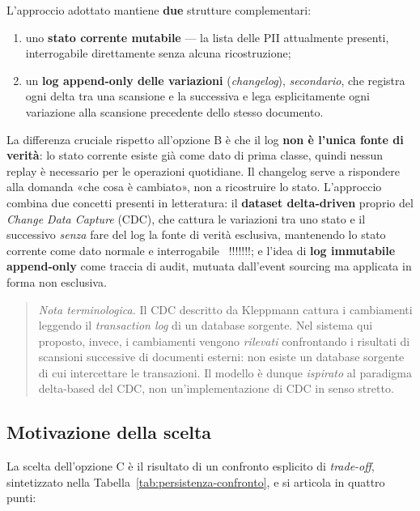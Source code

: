 L'approccio adottato mantiene \textbf{due} strutture complementari:
\begin{enumerate}
	\item uno \textbf{stato corrente mutabile} --- la lista delle PII attualmente presenti, interrogabile direttamente senza alcuna ricostruzione;
	\item un \textbf{log append-only delle variazioni} (\textit{changelog}), \textit{secondario}, che registra ogni delta tra una scansione e la successiva e lega esplicitamente ogni variazione alla scansione precedente dello stesso documento.
\end{enumerate}

La differenza cruciale rispetto all'opzione B è che il log \textbf{non è l'unica fonte di verità}: lo stato corrente esiste già come dato di prima classe, quindi nessun replay è necessario per le operazioni quotidiane. Il changelog serve a rispondere alla domanda «che cosa è cambiato», non a ricostruire lo stato. L'approccio combina due concetti presenti in letteratura: il \textbf{dataset delta-driven} proprio del \textit{Change Data Capture} (CDC), che cattura le variazioni tra uno stato e il successivo \textit{senza} fare del log la fonte di verità esclusiva, mantenendo lo stato corrente come dato normale e interrogabile~\cite{kleppmannDesigningDataIntensive2017} !!!!!!!; e l'idea di \textbf{log immutabile append-only} come traccia di audit, mutuata dall'event sourcing ma applicata in forma non esclusiva.

\begin{quote}
	\textit{Nota terminologica.} Il CDC descritto da Kleppmann cattura i cambiamenti leggendo il \textit{transaction log} di un database sorgente. Nel sistema qui proposto, invece, i cambiamenti vengono \textit{rilevati} confrontando i risultati di scansioni successive di documenti esterni: non esiste un database sorgente di cui intercettare le transazioni. Il modello è dunque \textit{ispirato} al paradigma delta-based del CDC, non un'implementazione di CDC in senso stretto.
\end{quote}

\subsection{Motivazione della scelta}
\label{sub:persistenza-scelta}

La scelta dell'opzione C è il risultato di un confronto esplicito di \textit{trade-off}, sintetizzato nella Tabella~\ref{tab:persistenza-confronto}, e si articola in quattro punti:

